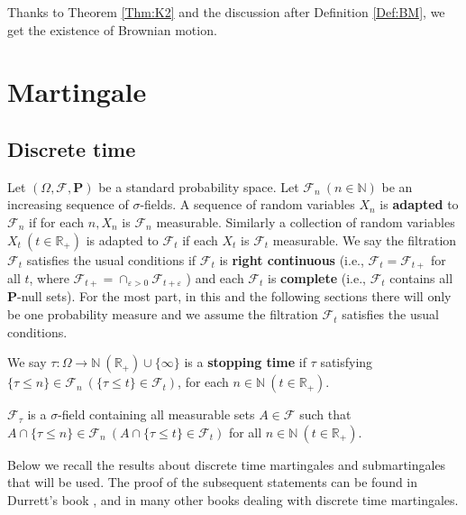 \documentclass[twoside, 12pt]{book}
\numberwithin{equation}{chapter}
\def\cF{{\mathcal F}}
\def\mN{{\mathbb N}}
\def\mR{{\mathbb R}}
\def\bP{{\mathbf P}}
\def\bT{{\mathbf T}}
\def\leq{\leqslant}
\begin{document}
	Thanks to Theorem \ref{Thm:K2} and the discussion after Definition \ref{Def:BM}, we get the existence of Brownian motion. 
	
	
	\section{Martingale}
	
	
	\subsection{Discrete time}
	
	
	Let $(\Omega, \cF, \bP)$ be a standard probability space. Let $\mathcal{F}_n\ (n\in \mN)$ be an increasing sequence of $\sigma$-fields. A sequence of random variables $X_n$ is {\bf adapted} to $\mathcal{F}_n$ if for each $n, X_n$ is $\mathcal{F}_n$ measurable. Similarly a collection of random variables $X_t\ (t\in \mR_+)$ is adapted to $\mathcal{F}_t$ if each $X_t$ is $\mathcal{F}_t$ measurable. We say the filtration $\mathcal{F}_t$ satisfies the usual conditions if $\mathcal{F}_t$ is {\bf right continuous} (i.e., $\mathcal{F}_t=\mathcal{F}_{t+}$ for all $t$, where $\mathcal{F}_{t+}=\cap_{\varepsilon>0} \mathcal{F}_{t+\varepsilon}$ ) and each $\mathcal{F}_t$ is {\bf complete} (i.e., $\mathcal{F}_t$ contains all $\mathbf{P}$-null sets). For the most part, in this and the following sections there will only be one probability measure and we assume the filtration $\mathcal{F}_t$ satisfies the usual conditions. %
	 
	We say $\tau: \Omega\to \mN \ (\mR_+) \cup\{\infty\}$ is a {\bf stopping time} if $\tau$ satisfying $\{\tau\leq n\}\in \cF_n \ (\{\tau\leq t\}\in \cF_t)$, for each $n\in \mN \ (t\in \mR_+)$.  
	 
	$\mathcal{F}_\tau$ is a $\sigma$-field containing all measurable sets $A\in \cF$ such that $A \cap \{\tau \leq n\} \in \mathcal{F}_n\ (A \cap \{\tau \leq t\} \in\cF_t)$ for all $n\in \mN\ (t \in \mR_+)$. 
	
	\medspace
	
	Below we recall the results about discrete time martingales and submartingales that will be used. The proof of the subsequent statements can be found in Durrett’s book \cite{durrett2019probability}, and in many other books dealing with discrete time martingales.
	
\end{document}
